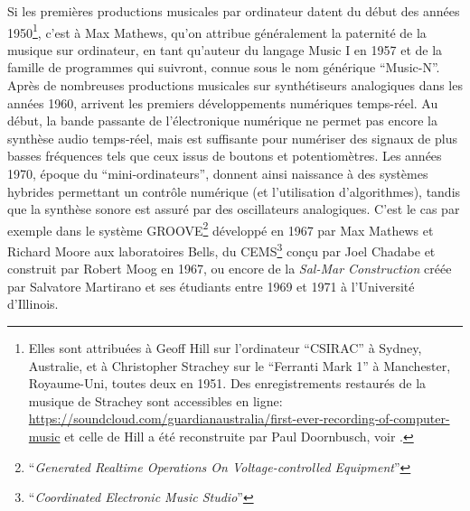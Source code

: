 \noindent Si les premières productions musicales par ordinateur datent du début des années 1950\footnote{Elles sont attribuées à Geoff Hill sur l'ordinateur ``CSIRAC'' à Sydney, Australie, et à Christopher Strachey sur le ``Ferranti Mark 1'' à Manchester, Royaume-Uni, toutes deux en 1951. Des enregistrements restaurés de la musique de Strachey sont accessibles en ligne: \\ \url{https://soundcloud.com/guardianaustralia/first-ever-recording-of-computer-music} et celle de Hill a été reconstruite par Paul Doornbusch, voir \cite{doornbusch_computer_2004}.}, c'est à Max Mathews, qu'on attribue généralement la paternité de la musique sur ordinateur, en tant qu'auteur du langage Music I en 1957 et de la famille de programmes qui suivront, connue sous le nom générique ``Music-N''.\\
\indent Après de nombreuses productions musicales sur synthétiseurs analogiques dans les années 1960, arrivent les premiers développements numériques temps-réel. Au début, la bande passante de l'électronique numérique ne permet pas encore la synthèse audio temps-réel, mais est suffisante pour numériser des signaux de plus basses fréquences tels que ceux issus de boutons et potentiomètres. Les années 1970, époque du ``mini-ordinateurs'', donnent ainsi naissance à des systèmes hybrides permettant un contrôle numérique (et l'utilisation d'algorithmes), tandis que la synthèse sonore est assuré par des oscillateurs analogiques. C'est le cas par exemple dans le système GROOVE\footnote{``\textit{Generated Realtime Operations On Voltage-controlled Equipment}''} développé en 1967 par Max Mathews et Richard Moore aux laboratoires Bells, du CEMS\footnote{``\textit{Coordinated Electronic Music Studio}''} conçu par Joel Chadabe et construit par Robert Moog en 1967, ou encore de la \textit{Sal-Mar Construction} créée par Salvatore Martirano et ses étudiants entre 1969 et 1971 à l'Université d'Illinois.\\
